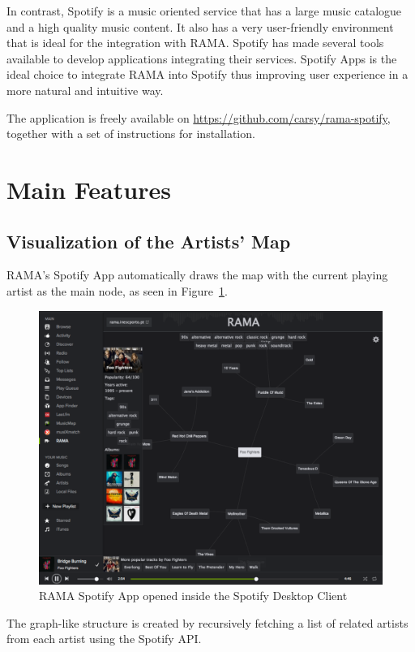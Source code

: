 \documentclass{article}
\begin{document}
    In contrast, Spotify is a music oriented service that has a large music catalogue and a high quality music content.
    It also has a very user-friendly environment that is ideal for the integration with RAMA.
    Spotify has made several tools available to develop applications\cite{spotifydev} integrating their services.
    Spotify Apps is the ideal choice to integrate RAMA into Spotify thus improving user experience in a more natural and intuitive way.

The application is freely available on \url{https://github.com/carsy/rama-spotify}, together with a 
set of instructions for installation.

\vspace{-0.2cm}
  \section{Main Features}
  \label{sec:features}

    \subsection{Visualization of the Artists' Map}
    \label{sub:visualization}

      RAMA's Spotify App automatically draws the map with the current playing artist as the main node, as seen in Figure~\ref{fig:spotify_app}.
      \begin{figure}[hb]
        \begin{center}
          \includegraphics[width=\columnwidth]{../report/figures/graph_rootnode.pdf}
        \end{center}
        \caption{RAMA Spotify App opened inside the Spotify Desktop Client}
        \label{fig:spotify_app}
      \end{figure}
      The graph-like structure is created by recursively fetching a list of related artists from each artist using the Spotify API\cite{spotifyapiartists}.
\end{document}
